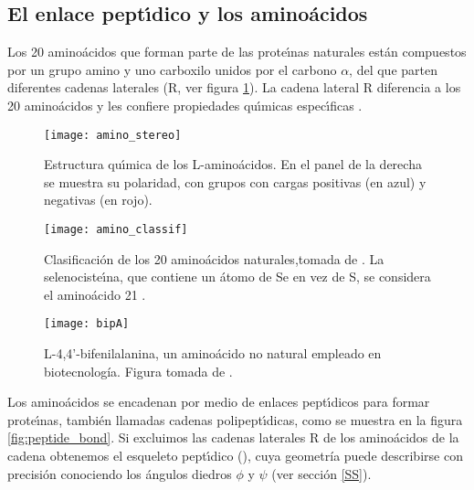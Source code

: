 \subsection{El enlace pept\'\i{}dico y los amino\'{a}cidos}
Los 20 amino\'{a}cidos que forman parte de las prote\'\i{}nas naturales est\'{a}n compuestos por un grupo amino 
y uno carboxilo unidos por el carbono \(\alpha\), del que parten diferentes cadenas laterales (R, ver 
figura \ref{fig:amino_stereo}). La cadena lateral R diferencia a los 20 amino\'{a}cidos y les confiere propiedades 
qu\'\i{}micas espec\'\i{}ficas \citep{yruela_inmaculada_2014_1067867}.

\begin{figure}
\begin{center} 
\texttt{[image: amino\_stereo]}
\caption%
{
Estructura qu\'\i{}mica de los L-amino\'{a}cidos.
En el panel de la derecha se muestra su polaridad, con grupos con cargas positivas (en azul) y negativas (en rojo).
}
\label{fig:amino_stereo}
\end{center}
\end{figure}

\begin{figure}
\begin{center} 
\texttt{[image: amino\_classif]}
\caption%
{
Clasificaci\'{o}n de los 20 amino\'{a}cidos naturales,tomada de .
La selenociste\'\i{}na, que contiene un \'{a}tomo de Se en vez de S, se considera el amino\'{a}cido 21 \citep{Santesmasses2017,Granold2018}.
}
\label{fig:amino_classif}
\end{center}
\end{figure}

\begin{figure}
\begin{center} 
\texttt{[image: bipA]}
\caption%
{
L-4,4'-bifenilalanina, un amino\'{a}cido no natural empleado en biotecnolog\'{i}a.
Figura tomada de .
}
\label{fig:bipA}
\end{center}
\end{figure}

Los amino\'{a}cidos se encadenan por medio de enlaces 
pept\'\i{}dicos para formar prote\'\i{}nas, tambi\'{e}n llamadas cadenas polipept\'\i{}dicas, como se muestra en la 
figura \ref{fig:peptide_bond}. Si excluimos las cadenas laterales R de los amino\'{a}cidos de la cadena obtenemos 
el esqueleto pept\'\i{}dico (), 
cuya geometr\'{i}a puede describirse con precisi\'{o}n conociendo los \'{a}ngulos diedros $\phi$ y $\psi$ (ver secci\'{o}n \ref{SS}).

